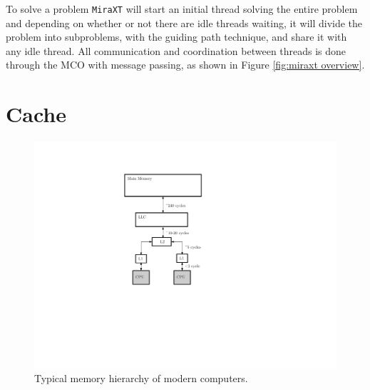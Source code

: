 \documentclass[12pt]{diicc}
\begin{document}
To solve a problem \texttt{MiraXT} will start an initial thread solving the entire problem and depending on whether or not there are idle threads waiting, it will divide the problem into subproblems, with the guiding path technique, and share it with any idle thread. All communication and coordination between threads is done through the MCO with message passing, as shown in Figure \ref{fig:miraxt overview}. 

\section{Cache}

\begin{figure}[h!]
	\centering
		\includegraphics[scale=1]{cache}
	\caption{Typical memory hierarchy of modern computers.}
	\label{fig:cache}
\end{figure}
\end{document}
